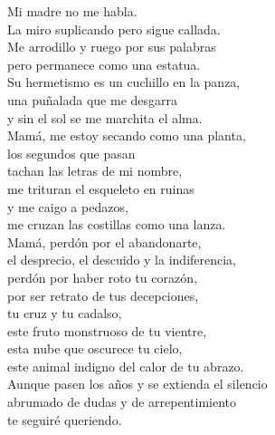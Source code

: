 

Mi madre no me habla.\\
La miro suplicando pero sigue callada.\\
Me arrodillo y ruego por sus palabras\\
pero permanece como una estatua.\\
Su hermetismo es un cuchillo en la panza,\\
una puñalada que me desgarra\\
y sin el sol se me marchita el alma.\\
Mamá, me estoy secando como una planta,\\
los segundos que pasan\\
tachan las letras de mi nombre,\\
me trituran el esqueleto en ruinas\\
y me caigo a pedazos,\\
me cruzan las costillas como una lanza.\\
Mamá, perdón por el abandonarte,\\
el desprecio, el descuido y la indiferencia,\\
perdón por haber roto tu corazón,\\
por ser retrato de tus decepciones,\\
tu cruz y tu cadalso,\\
este fruto monstruoso de tu vientre,\\
esta nube que oscurece tu cielo,\\
este animal indigno del calor de tu abrazo.\\
Aunque pasen los años y se extienda el silencio\\
abrumado de dudas y de arrepentimiento\\
te seguiré queriendo.\\

